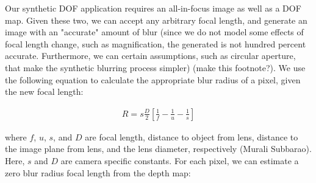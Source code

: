 \documentclass[annual]{acmsiggraph}
\begin{document}
Our synthetic DOF application requires an all-in-focus image as well as a DOF map. Given these two, we can accept any arbitrary focal length,
and generate an image with an "accurate" amount of blur (since we do not model some effects of focal length change, such as magnification,  the
generated is not hundred percent accurate. Furthermore, we can certain assumptions, such as circular aperture, that make the synthetic blurring 
process simpler) (make this footnote?). We use the following equation to calculate the appropriate blur radius of a pixel, given
the new focal length: 

\begin{eqnarray} 
R=s\frac{D}{2}[\frac{1}{f}-\frac{1}{u}-\frac{1}{s}]
\end{eqnarray}

where $f$, $u$, $s$, and $D$ are focal length, distance to object from lens, distance to the image plane from lens, and the lens diameter, 
respectively (Murali Subbarao). Here, $s$ and $D$ are camera specific constants. For each pixel, we can estimate a zero blur radius focal length
from the depth map:
\end{document}
